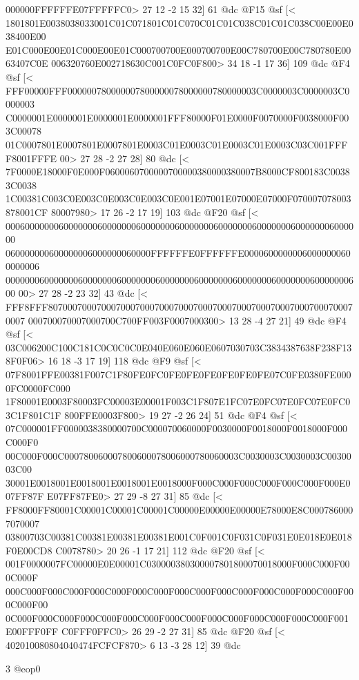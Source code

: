{{{{{{{000000FFFFFFE07FFFFFC0>
	 27 12 -2 15 32] 61 @dc
@F15 @sf
[<
1801801E0038038033001C01C071801C01C070C01C01C038C01C01C038C00E00E038400E00
E01C000E00E01C000E00E01C000700700E000700700E00C780700E00C780780E0063407C0E
006320760E002718630C001C0FC0F800>
	 34 18 -1 17 36] 109 @dc
@F4 @sf
[<
FFF00000FFF000000780000007800000078000000780000003C0000003C0000003C0000003
C0000001E0000001E0000001E0000001FFF80000F01E0000F0070000F0038000F003C00078
01C0007801E0007801E0007801E0003C01E0003C01E0003C01E0003C03C001FFFF8001FFFE
00>
	 27 28 -2 27 28] 80 @dc
[<
7F0000E18000F0E000F0600060700000700000380000380007B8000CF800183C00383C0038
1C00381C003C0E003C0E003C0E003C0E001E07001E07000E07000F070007078003878001CF
80007980>
	 17 26 -2 17 19] 103 @dc
@F20 @sf
[<
00060000000600000006000000060000000600000006000000060000000600000006000000
060000000600000006000000060000FFFFFFE0FFFFFFE00006000000060000000600000006
00000006000000060000000600000006000000060000000600000006000000060000000600
00>
	 27 28 -2 23 32] 43 @dc
[<
FFF8FFF8070007000700070007000700070007000700070007000700070007000700070007
000700070007000700C700FF003F0007000300>
	 13 28 -4 27 21] 49 @dc
@F4 @sf
[<
03C006200C100C181C0C0C0C0E040E060E060E0607030703C3834387638F238F138F0F06>
	 16 18 -3 17 19] 118 @dc
@F9 @sf
[<
07F8001FFE00381F007C1F80FE0FC0FE0FE0FE0FE0FE0FE07C0FE0380FE0000FC0000FC000
1F80001E0003F80003FC00003E00001F003C1F807E1FC07E0FC07E0FC07E0FC03C1F801C1F
800FFE0003F800>
	 19 27 -2 26 24] 51 @dc
@F4 @sf
[<
07C000001FF0000038380000700C000070060000F0030000F0018000F0018000F000C000F0
00C000F000C000780060007800600078006000780060003C0030003C0030003C0030003C00
30001E0018001E0018001E0018001E0018000F000C000F000C000F000C000F000E007FF87F
E07FF87FE0>
	 27 29 -8 27 31] 85 @dc
[<
FF8000FF80001C00001C00001C00001C00000E00000E00000E78000E8C0007860007070007
03800703C00381C00381E00381E00381E001C0F001C0F031C0F031E0E018E0E018F0E00CD8
C0078780>
	 20 26 -1 17 21] 112 @dc
@F20 @sf
[<
001F0000007FC00000E0E00001C030000380300007801800070018000F000C000F000C000F
000C000F000C000F000C000F000C000F000C000F000C000F000C000F000C000F000C000F00
0C000F000C000F000C000F000C000F000C000F000C000F000C000F000C000F001E00FFF0FF
C0FFF0FFC0>
	 26 29 -2 27 31] 85 @dc
@F20 @sf
[<
402010080804040474FCFCF870>
	 6 13 -3 28 12] 39 @dc

3 @eop0

}}}}}}}

